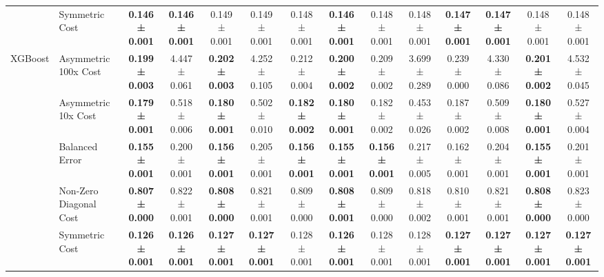 \begin{table}[H]
{\begin{tabular}{llcccccccccccc}
 & Symmetric Cost & \textbf{0.146 ± 0.001} & \textbf{0.146 ± 0.001} & 0.149 ± 0.001 & 0.149 ± 0.001 & 0.148 ± 0.001 & \textbf{0.146 ± 0.001} & 0.148 ± 0.001 & 0.148 ± 0.001 & \textbf{0.147 ± 0.001} & \textbf{0.147 ± 0.001} & 0.148 ± 0.001 & 0.148 ± 0.001 \\
\cline{1-14}
\multirow[t]{5}{*}{XGBoost} & Asymmetric 100x Cost & \textbf{0.199 ± 0.003} & 4.447 ± 0.061 & \textbf{0.202 ± 0.003} & 4.252 ± 0.105 & 0.212 ± 0.004 & \textbf{0.200 ± 0.002} & 0.209 ± 0.002 & 3.699 ± 0.289 & 0.239 ± 0.000 & 4.330 ± 0.086 & \textbf{0.201 ± 0.002} & 4.532 ± 0.045 \\
 & Asymmetric 10x Cost & \textbf{0.179 ± 0.001} & 0.518 ± 0.006 & \textbf{0.180 ± 0.001} & 0.502 ± 0.010 & \textbf{0.182 ± 0.002} & \textbf{0.180 ± 0.001} & 0.182 ± 0.002 & 0.453 ± 0.026 & 0.187 ± 0.002 & 0.509 ± 0.008 & \textbf{0.180 ± 0.001} & 0.527 ± 0.004 \\
 & Balanced Error & \textbf{0.155 ± 0.001} & 0.200 ± 0.001 & \textbf{0.156 ± 0.001} & 0.205 ± 0.001 & \textbf{0.156 ± 0.001} & \textbf{0.155 ± 0.001} & \textbf{0.156 ± 0.001} & 0.217 ± 0.005 & 0.162 ± 0.001 & 0.204 ± 0.001 & \textbf{0.155 ± 0.001} & 0.201 ± 0.001 \\
 & Non-Zero Diagonal Cost & \textbf{0.807 ± 0.000} & 0.822 ± 0.001 & \textbf{0.808 ± 0.000} & 0.821 ± 0.001 & 0.809 ± 0.000 & \textbf{0.808 ± 0.001} & 0.809 ± 0.000 & 0.818 ± 0.002 & 0.810 ± 0.001 & 0.821 ± 0.001 & \textbf{0.808 ± 0.000} & 0.823 ± 0.000 \\
 & Symmetric Cost & \textbf{0.126 ± 0.001} & \textbf{0.126 ± 0.001} & \textbf{0.127 ± 0.001} & \textbf{0.127 ± 0.001} & 0.128 ± 0.001 & \textbf{0.126 ± 0.001} & 0.128 ± 0.001 & 0.128 ± 0.001 & \textbf{0.127 ± 0.001} & \textbf{0.127 ± 0.001} & \textbf{0.127 ± 0.001} & \textbf{0.127 ± 0.001} \\
\cline{1-14}
\bottomrule
\end{tabular}
    }
\end{table}
